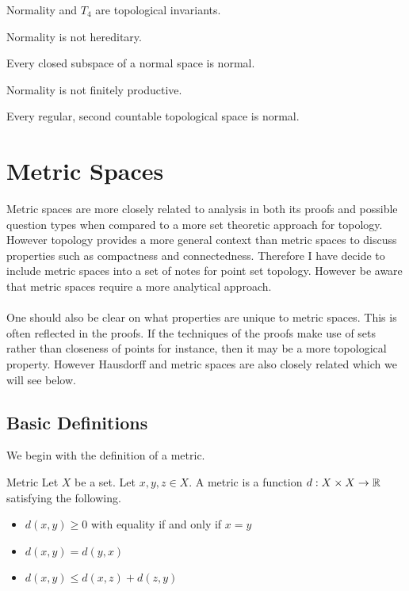 \documentclass[a4paper]{article}
\begin{document}
\begin{prp}{}{} Normality and $T_4$ are topological invariants. 
\end{prp}

\begin{prp}{}{} Normality is not hereditary. 
\end{prp}

\begin{prp}{}{} Every closed subspace of a normal space is normal. 
\end{prp}

\begin{prp}{}{} Normality is not finitely productive. 
\end{prp}

\begin{thm}{}{} Every regular, second countable topological space is normal. 
\end{thm}

\pagebreak
\section{Metric Spaces}
Metric spaces are more closely related to analysis in both its proofs and possible question types when compared to a more set theoretic approach for topology. However topology provides a more general context than metric spaces to discuss properties such as compactness and connectedness. Therefore I have decide to include metric spaces into a set of notes for point set topology. However be aware that metric spaces require a more analytical approach. \\~\\
One should also be clear on what properties are unique to metric spaces. This is often reflected in the proofs. If the techniques of the proofs make use of sets rather than closeness of points for instance, then it may be a more topological property. However Hausdorff and metric spaces are also closely related which we will see below. 
\subsection{Basic Definitions}
We begin with the definition of a metric. 
\begin{defn}{Metric}{} Let $X$ be a set. Let $x,y,z\in X$. A metric is a function $d:X\times X\to\mathbb{R}$ satisfying the following. 
\begin{itemize}
\item $d(x,y)\geq 0$ with equality if and only if $x=y$
\item $d(x,y)=d(y,x)$
\item $d(x,y)\leq d(x,z)+d(z,y)$
\end{itemize}
\end{defn}
\end{document}
